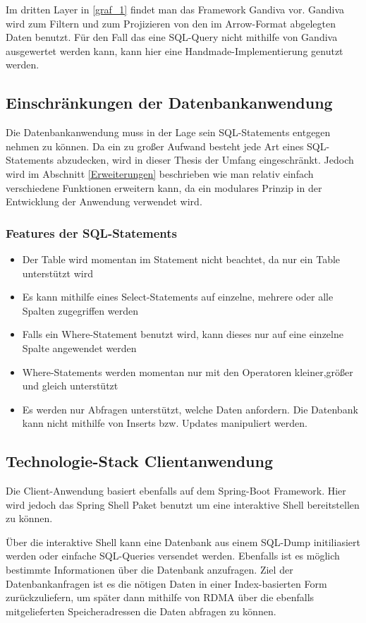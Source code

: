 Im dritten Layer in \ref{graf_1} findet man das Framework Gandiva vor. 
Gandiva wird zum Filtern und zum Projizieren von den im Arrow-Format abgelegten Daten benutzt. Für den Fall das eine SQL-Query nicht mithilfe von Gandiva ausgewertet werden kann, kann hier eine Handmade-Implementierung genutzt werden.

\subsection{Einschränkungen der Datenbankanwendung}

Die Datenbankanwendung muss in der Lage sein SQL-Statements entgegen nehmen zu können. Da ein zu großer Aufwand besteht jede Art eines SQL-Statements abzudecken, wird in dieser Thesis der Umfang eingeschränkt. Jedoch wird im Abschnitt \ref{Erweiterungen} beschrieben wie man relativ einfach verschiedene Funktionen erweitern kann, da ein modulares Prinzip in der Entwicklung der Anwendung verwendet wird.

\subsubsection{Features der SQL-Statements}

\begin{itemize}
\item Der Table wird momentan im Statement nicht beachtet, da nur ein Table unterstützt wird 
 \item Es kann mithilfe eines Select-Statements auf einzelne, mehrere oder alle Spalten zugegriffen werden
 \item Falls ein Where-Statement benutzt wird, kann dieses nur auf eine einzelne Spalte angewendet werden
 \item Where-Statements werden momentan nur mit den Operatoren kleiner,größer und gleich unterstützt
 \item Es werden nur Abfragen unterstützt, welche Daten anfordern. Die Datenbank kann nicht mithilfe von Inserts bzw. Updates manipuliert werden.
\end{itemize}




\subsection{Technologie-Stack Clientanwendung}

Die Client-Anwendung basiert ebenfalls auf dem Spring-Boot Framework. Hier wird jedoch das Spring Shell Paket benutzt um eine interaktive Shell bereitstellen zu können.

Über die interaktive Shell kann eine Datenbank aus einem SQL-Dump initiliasiert werden oder einfache SQL-Queries versendet werden. Ebenfalls ist es möglich bestimmte Informationen über die Datenbank anzufragen.
Ziel der Datenbankanfragen ist es die nötigen Daten in einer Index-basierten Form zurückzuliefern, um später dann mithilfe von RDMA über die ebenfalls mitgelieferten Speicheradressen die Daten abfragen zu können.



